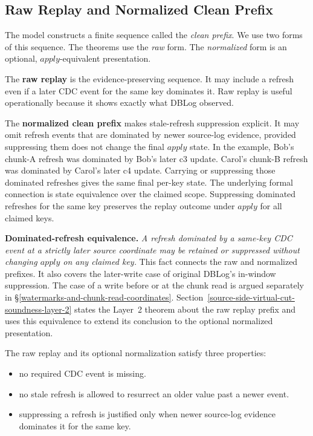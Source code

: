 \documentclass[letterpaper,10pt,twocolumn]{article}
\newcommand{\Apply}{\mathit{apply}}
\providecommand{\tightlist}{\setlength{\itemsep}{0pt}\setlength{\parskip}{0pt}}
\begin{document}
\subsection{Raw Replay and Normalized Clean
Prefix}\label{raw-replay-and-normalized-clean-prefix}

The model constructs a finite sequence called the \emph{clean prefix}. We use
two forms of this sequence. The theorems use the \emph{raw} form. The
\emph{normalized} form is an optional, $\Apply$-equivalent presentation.

The \textbf{raw replay} is the evidence-preserving sequence. It may
include a refresh even if a later CDC event for the same key dominates
it. Raw replay is useful operationally because it shows exactly what
DBLog observed.

The \textbf{normalized clean prefix} makes stale-refresh suppression
explicit. It may omit refresh events that are dominated by newer
source-log evidence, provided suppressing them does not change the final
$\Apply$ state. In the example, Bob's chunk-A refresh was
dominated by Bob's later c3 update. Carol's chunk-B refresh was
dominated by Carol's later c4 update. Carrying or suppressing those
dominated refreshes gives the same final per-key state. The underlying
formal connection is state equivalence over the claimed scope. Suppressing
dominated refreshes for the same key preserves the replay outcome under
$\Apply$ for all claimed keys.

\smallskip
\noindent\textbf{Dominated-refresh equivalence.} \emph{A refresh
dominated by a same-key CDC event at a strictly later source coordinate
may be retained or suppressed without changing $\Apply$ on any claimed
key.} This fact connects the raw and normalized prefixes. It also covers
the later-write case of original DBLog's in-window suppression. The
case of a write before or at the chunk read is argued separately in
\S\ref{watermarks-and-chunk-read-coordinates}.
Section~\ref{source-side-virtual-cut-soundness-layer-2} states the
Layer~2 theorem about the raw replay prefix and uses this equivalence
to extend its conclusion to the optional normalized presentation.

The raw replay and its optional normalization satisfy three properties:

\begin{itemize}\tightlist
\item no required CDC event is missing.
\item no stale refresh is allowed to resurrect an older value past a
  newer event.
\item suppressing a refresh is justified only when newer source-log
  evidence dominates it for the same key.
\end{itemize}
\end{document}
